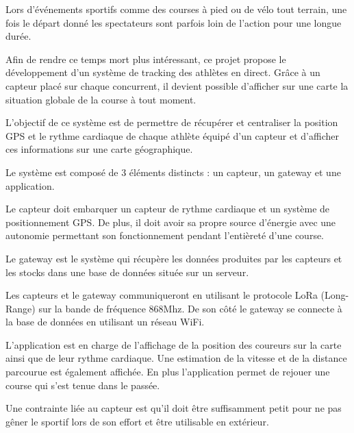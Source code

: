 
Lors d’événements sportifs comme des courses à pied ou de vélo tout terrain, une fois le départ donné les spectateurs sont parfois loin de l’action pour une longue durée.

Afin de rendre ce temps mort plus intéressant, ce projet propose le développement d’un système de tracking des athlètes en direct. Grâce à un capteur placé sur chaque concurrent, il devient possible d’afficher sur une carte la situation globale de la course à tout moment.

L’objectif de ce système est de permettre de récupérer et centraliser la position GPS et le rythme cardiaque de chaque athlète équipé d’un capteur et d’afficher ces informations sur une carte géographique.

Le système est composé de 3 éléments distincts : un capteur, un gateway et une application.

Le capteur doit embarquer un capteur de rythme cardiaque et un système de positionnement GPS. De plus, il doit avoir sa propre source d’énergie avec une autonomie permettant son fonctionnement pendant l’entièreté d’une course.

Le gateway est le système qui récupère les données produites par les capteurs et les stocks dans une base de données située sur un serveur.

Les capteurs et le gateway communiqueront en utilisant le protocole LoRa (Long-Range) sur la bande de fréquence 868Mhz. De son côté le gateway se connecte à la base de données en utilisant un réseau WiFi.

L’application est en charge de l’affichage de la position des coureurs sur la carte ainsi que de leur rythme cardiaque. Une estimation de la vitesse et de la distance parcourue est également affichée. En plus l’application permet de rejouer une course qui s’est tenue dans le passée.

Une contrainte liée au capteur est qu’il doit être suffisamment petit pour ne pas gêner le sportif lors de son effort et être utilisable en extérieur.
